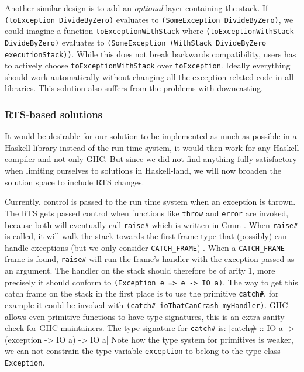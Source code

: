 Another similar design is to add an \emph{optional} layer containing
the stack. If \texttt{(toException DivideByZero)} evaluates to
\texttt{(SomeException DivideByZero)}, we could imagine a function
\texttt{toExceptionWithStack} where \texttt{(toExceptionWithStack
DivideByZero)} evaluates to \texttt{(SomeException (WithStack
DivideByZero executionStack))}. While this does not break backwards
compatibility, users has to actively choose
\texttt{toExceptionWithStack} over \texttt{toException}. Ideally
everything should work automatically without changing all the exception
related code in all libraries. This solution also suffers from the
problems with downcasting.

\subsubsection{RTS-based solutions}

It would be desirable for our solution to be implemented as much
as possible in a Haskell library instead of the run time system, it
would then work for any Haskell compiler and not only GHC. But since we
did not find anything fully satisfactory when limiting ourselves to
solutions in Haskell-land, we will now broaden the solution space to
include RTS changes.

Currently, control is passed to the run time system when an
exception is thrown. The RTS gets passed control when functions like
\texttt{throw} \cite{hackage_base_control_exception_throw} and \texttt{error}
are invoked, because both will eventually call \texttt{raise\#} which is
written in Cmm \cite{github_raisezh}. When \texttt{raise\#} is called, it
will walk the stack towards the first frame type that (possibly) can
handle exceptions (but we only consider \texttt{CATCH\_FRAME})
\cite{github_raisezh_calls_helper, github_raiseExceptionHelter}.
When a \texttt{CATCH\_FRAME} frame is found, \texttt{raise\#} will
run the frame's handler with the exception passed as an argument. The
handler on the stack should therefore be of arity 1, more precisely
it should conform to \texttt{(Exception e => e -> IO a)}. The way to get
this catch frame on the stack in the first place is to use the primitive
\texttt{catch\#}, for example it could be invoked with \texttt{(catch\#
  ioThatCanCrash myHandler)}. GHC allows even primitive functions to
have type signatures, this is an extra sanity check for GHC maintainers.
The type signature for \texttt{catch\#} is:
|catch# :: IO a -> (exception -> IO a) -> IO a|
Note how the type system for primitives is weaker, we can not constrain
the type variable \texttt{exception} to belong to the type class \texttt{Exception}.

